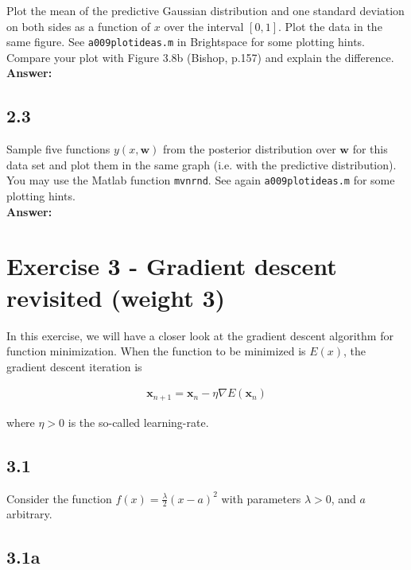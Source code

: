 \documentclass[a4paper]{article}
\begin{document}
Plot the mean of the predictive Gaussian distribution and one standard deviation on both sides as a function of $x$ over the interval $[0,1]$. Plot the data in the same figure. See \texttt{a009plotideas.m} in Brightspace for some plotting hints. Compare your plot with Figure 3.8b (Bishop, p.157) and explain the difference.\\

\textbf{Answer:}\\



\subsection*{2.3}

Sample five functions $y(x,\textbf{w})$ from the posterior distribution over $\textbf{w}$ for this data set and plot them in the same graph (i.e. with the predictive distribution). You may use the Matlab function \texttt{mvnrnd}. See again \texttt{a009plotideas.m} for some plotting hints.\\

\textbf{Answer:}\\



\section*{Exercise 3 - Gradient descent revisited (weight 3)}

In this exercise, we will have a closer look at the gradient descent algorithm for function minimization. When the function to be minimized is $E(x)$, the gradient descent iteration is


\begin{eqnarray}
\textbf{x}_{n + 1} = \textbf{x}_n - \eta \nabla E(\textbf{x}_n)
\end{eqnarray}

where $\eta > 0$ is the so-called learning-rate.

\subsection*{3.1}

Consider the function $f(x) = \frac{\lambda}{2}(x - a)^2$ with parameters $\lambda > 0$, and $a$ arbitrary.


\subsection*{3.1a}
\end{document}
